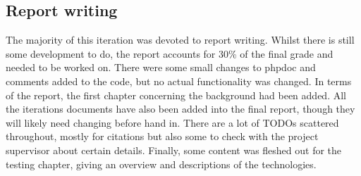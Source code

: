 \subsection{Report writing}
The majority of this iteration was devoted to report writing. Whilst there is still some development to do, the report accounts for 30\% of the final grade and needed to be worked on. There were some small changes to phpdoc and comments added to the code, but no actual functionality was changed. In terms of the report, the first chapter concerning the background had been added. All the iterations documents have also been added into the final report, though they will likely need changing before hand in. There are a lot of TODOs scattered throughout, mostly for citations but also some to check with the project supervisor about certain details. Finally, some content was fleshed out for the testing chapter, giving an overview and descriptions of the technologies.
\newpage